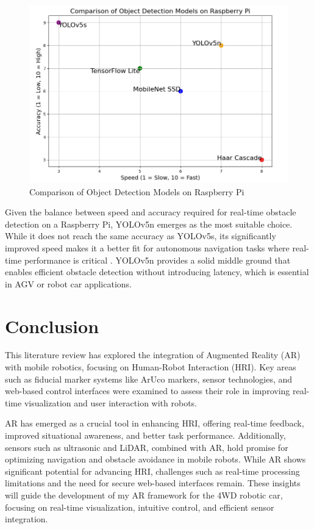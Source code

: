 \begin{figure}[h]
	\centering
	\includegraphics[width=0.74\linewidth]{ch2/figs/Comparison.png}
	\caption{Comparison of Object Detection Models on Raspberry Pi}
	\label{fig:object_detection_comparison}
\end{figure}

Given the balance between speed and accuracy required for real-time obstacle detection on a Raspberry Pi, YOLOv5n emerges as the most suitable choice. While it does not reach the same accuracy as YOLOv5s, its significantly improved speed makes it a better fit for autonomous navigation tasks where real-time performance is critical \cite{MuhammadYolo}. YOLOv5n provides a solid middle ground that enables efficient obstacle detection without introducing latency, which is essential in AGV or robot car applications.


\section{Conclusion}

This literature review has explored the integration of Augmented Reality (AR) with mobile robotics, focusing on Human-Robot Interaction (HRI). Key areas such as fiducial marker systems like ArUco markers, sensor technologies, and web-based control interfaces were examined to assess their role in improving real-time visualization and user interaction with robots.

AR has emerged as a crucial tool in enhancing HRI, offering real-time feedback, improved situational awareness, and better task performance. Additionally, sensors such as ultrasonic and LiDAR, combined with AR, hold promise for optimizing navigation and obstacle avoidance in mobile robots. While AR shows significant potential for advancing HRI, challenges such as real-time processing limitations and the need for secure web-based interfaces remain. These insights will guide the development of my AR framework for the 4WD robotic car, focusing on real-time visualization, intuitive control, and efficient sensor integration.
